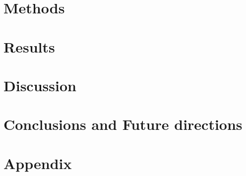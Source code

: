 \documentclass{article}
\begin{document}
\section{Methods}



\section{Results}

%

\section{Discussion}

%

\section{Conclusions and Future directions}

%

\newpage 



\newpage 
\section{Appendix}

%
\end{document}
